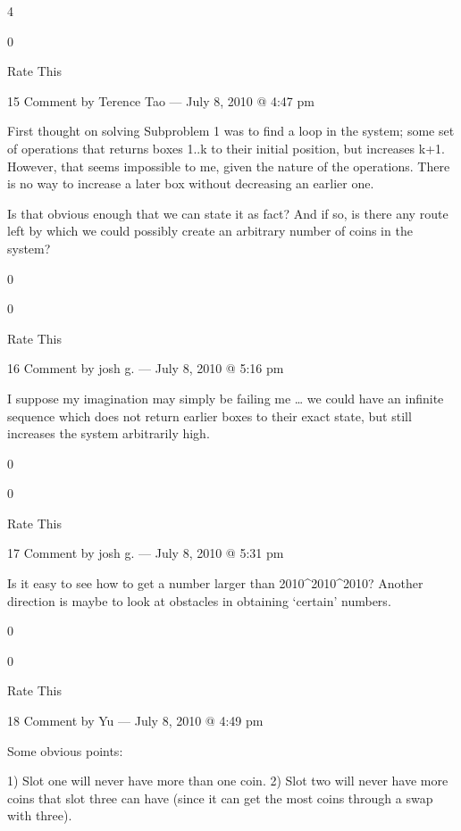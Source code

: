         4
         
        0
         
        Rate This

        15 Comment by Terence Tao — July 8, 2010 @ 4:47 pm

            First thought on solving Subproblem 1 was to find a loop
            in the system; some set of operations that returns boxes
            1..k to their initial position, but increases
            k+1. However, that seems impossible to me, given the
            nature of the operations. There is no way to increase a
            later box without decreasing an earlier one.

            Is that obvious enough that we can state it as fact? And
            if so, is there any route left by which we could possibly
            create an arbitrary number of coins in the system?
             
            0
             
            0
             
            Rate This

            16 Comment by josh g. — July 8, 2010 @ 5:16 pm

                I suppose my imagination may simply be failing me … we could have an infinite sequence which does not return earlier boxes to their exact state, but still increases the system arbitrarily high.
                 
                0
                 
                0
                 
                Rate This

               17 Comment by josh g. — July 8, 2010 @ 5:31 pm

        Is it easy to see how to get a number larger than 2010^{{2010}^{2010}}? Another direction is maybe to look at obstacles in obtaining ‘certain’ numbers.
         
        0
         
        0
         
        Rate This

        18 Comment by Yu — July 8, 2010 @ 4:49 pm

        Some obvious points:

        1) Slot one will never have more than one coin.
        2) Slot two will never have more coins that slot three can have (since it can get the most coins through a swap with three).
         
